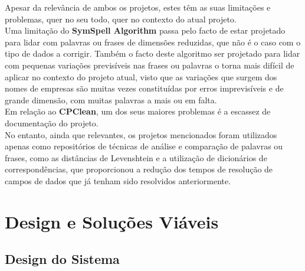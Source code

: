 \documentclass[a4paper,12pt]{article}
\begin{document}
Apesar da relevância de ambos os projetos, estes têm as suas limitações e problemas, quer no seu todo, quer no contexto do atual projeto. \\
Uma limitação do \textbf{SymSpell Algorithm} passa pelo facto de estar projetado para lidar com palavras ou frases de dimensões reduzidas, que não é o caso com o tipo de dados a corrigir. Também o facto deste algoritmo ser projetado para lidar com pequenas variações previsíveis nas frases ou palavras o torna mais difícil de aplicar no contexto do projeto atual, visto que as variações que surgem dos nomes de empresas são muitas vezes constituídas por erros imprevisíveis e de grande dimensão, com muitas palavras a mais ou em falta.
\\
Em relação ao \textbf{CPClean}, um dos seus maiores problemas é a escassez de documentação do projeto. 
\\
No entanto, ainda que relevantes, os projetos mencionados foram utilizados apenas como repositórios de técnicas de análise e comparação de palavras ou frases, como as distâncias de Levenshtein e a utilização de dicionários de correspondências, que proporcionou a redução dos tempos de resolução de campos de dados que já tenham sido resolvidos anteriormente.

\section{Design e Soluções Viáveis}
\subsection{Design do Sistema}
\end{document}

